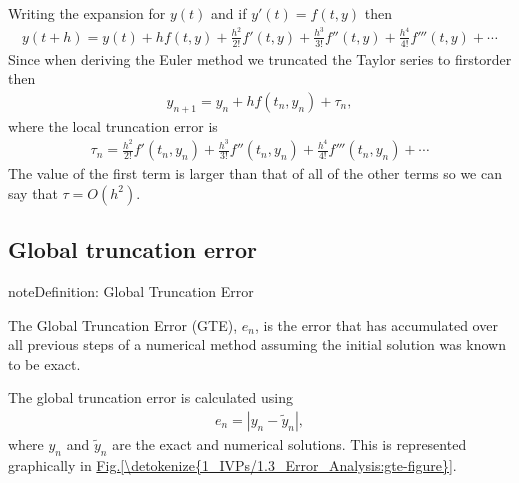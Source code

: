 \documentclass[letterpaper,10pt,english]{jupyterBook}
\begin{document}
\sphinxAtStartPar
Writing the {\hyperref[\detokenize{1_IVPs/1.1_Taylor_Series:taylor-series-definition}]{}} expansion for \(y(t)\) and if \(y'(t) = f(t, y)\) then
\begin{equation*}
\begin{split}y(t + h) = y(t) + hf(t, y) + \frac{h^2}{2!}f'(t, y) + \frac{h^3}{3!}f''(t, y) + \frac{h^4}{4!}f'''(t, y) + \cdots \end{split}
\end{equation*}
\sphinxAtStartPar
Since when deriving the Euler method we truncated the Taylor series to first\sphinxhyphen{}order then
\begin{equation*}
\begin{split}y_{n+1} = y_n + h f(t_n, y_n) + \tau_n,\end{split}
\end{equation*}
\sphinxAtStartPar
where the local truncation error is
\begin{equation*}
\begin{split} \tau_n = \frac{h^2}{2!}f'(t_n, y_n) + \frac{h^3}{3!}f''(t_n, y_n) + \frac{h^4}{4!}f'''(t_n, y_n) + \cdots \end{split}
\end{equation*}
\sphinxAtStartPar
The value of the first term is larger than that of all of the other terms so we can say that \(\tau = O(h^2)\).


\subsection{Global truncation error}
\label{\detokenize{1_IVPs/1.3_Error_Analysis:global-truncation-error}}\label{\detokenize{1_IVPs/1.3_Error_Analysis:global-truncation-error-section}}
\begin{sphinxadmonition}{note}{Definition: Global Truncation Error}

\sphinxAtStartPar
The Global Truncation Error (GTE), \(e_n\), is the error that has accumulated over all previous steps of a numerical method assuming the initial solution was known to be exact.
\end{sphinxadmonition}

\sphinxAtStartPar
The global truncation error is calculated using
\begin{align*}
    e_n = |y_n - \tilde{y}_n |,
\end{align*}
\sphinxAtStartPar
where \(y_n\) and \(\tilde{y}_n\) are the exact and numerical solutions. This is represented graphically in \hyperref[\detokenize{1_IVPs/1.3_Error_Analysis:gte-figure}]{Fig.\@ \ref{\detokenize{1_IVPs/1.3_Error_Analysis:gte-figure}}}.
\end{document}
